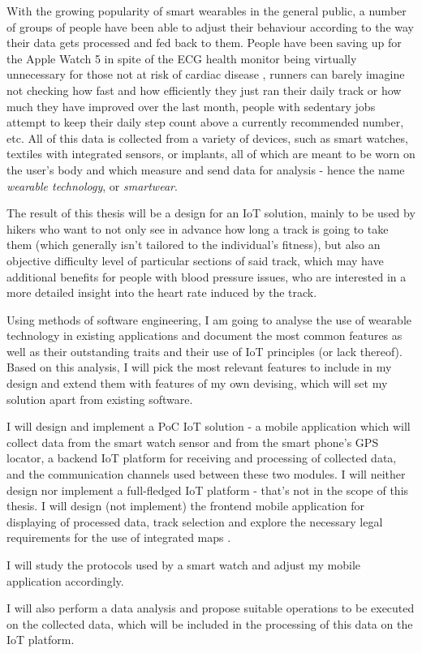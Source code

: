 \linebreak
With the growing popularity of smart wearables in the general public, a number of groups of people have been able to adjust their behaviour according to the way their data gets processed and fed back to them.
People have been saving up for the Apple Watch 5 \cite{AppleWatch5} in spite of the ECG health monitor being virtually unnecessary for those not at risk of cardiac disease \cite{ecg-screening},
runners can barely imagine not checking how fast and how efficiently they just ran their daily track or how much they have improved over the last month,
people with sedentary jobs attempt to keep their daily step count above a currently recommended number, etc.
All of this data is collected from a variety of devices, such as smart watches, textiles with integrated sensors, or implants, all of which are meant to be worn on the user's body and which measure and send data for analysis - hence the name \textit{wearable technology}, or \textit{smartwear}.

The result of this thesis will be a design for an IoT solution, mainly to be used by hikers who want to not only see in advance how long a track is going to take them (which generally isn't tailored to the individual's fitness),
but also an objective difficulty level of particular sections of said track, which may have additional benefits for people with blood pressure issues, who are interested in a more detailed insight into the heart rate induced by the track.

Using methods of software engineering, I am going to analyse the use of wearable technology in existing applications and document the most common features as well as their outstanding traits and their use of IoT principles (or lack thereof).
Based on this analysis, I will pick the most relevant features to include in my design and extend them with features of my own devising, which will set my solution apart from existing software.

I will design and implement a PoC IoT solution - a mobile application which will collect data from the smart watch sensor and from the smart phone's GPS locator, a backend IoT platform for receiving and processing of collected data, and the communication channels used between these two modules.
I will neither design nor implement a full-fledged IoT platform - that's not in the scope of this thesis.
I will design (not implement) the frontend mobile application for displaying of processed data, track selection and explore the necessary legal requirements for the use of integrated maps .

I will study the protocols used by a smart watch  and adjust my mobile application accordingly.

I will also perform a data analysis and propose suitable operations to be executed on the collected data, which will be included in the processing of this data on the IoT platform.

